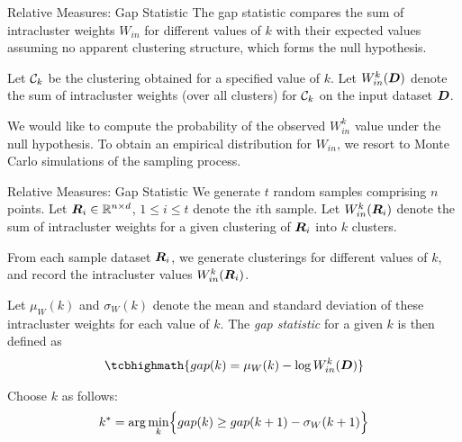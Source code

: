 \begin{frame}{Relative Measures: Gap Statistic}
The gap statistic compares the sum of
intracluster
weights $W_{in}$ 
for different values of $k$ with their expected values assuming
no apparent clustering structure, which forms the null hypothesis.

\bigskip
Let ${\mathcal C}_k$ be the clustering obtained for a specif\/{i}ed value of $k$.
Let $W_{in}^k({\boldsymbol D})$ denote
the sum of intracluster weights (over all clusters) for ${\mathcal C}_k$ on the
input dataset ${\boldsymbol D}$.

\bigskip
We would like to compute the probability of the observed
$W_{in}^k$ value under the null hypothesis.
To obtain an empirical distribution for $W_{in}$, we resort to Monte
Carlo simulations of the sampling process.  
\end{frame}

\begin{frame}{Relative Measures: Gap Statistic}
We generate $t$
random samples comprising $n$ points.
Let ${\boldsymbol R}_i \in {\mathord{\mathbb R}}^{n \times d}$, $1 \le i \le t$ denote the $i$th sample.
Let $W_{in}^k({\boldsymbol R}_i)$ denote the sum of intracluster weights for a
given clustering of ${\boldsymbol R}_i$ into $k$ clusters.

\medskip
From each sample
dataset ${\boldsymbol R}_i$, we generate clusterings for different values of $k$,
and record the intracluster values
$W_{in}^k({\boldsymbol R}_i)$.

\medskip
Let $\mu_W(k)$ and $\sigma_W(k)$ denote the
mean and standard deviation of these intracluster weights for each
value of $k$.
The {\em gap statistic} for a given $k$ is then def\/{i}ned as
\begin{align*}
\tcbhighmath{
  gap(k) = \mu_W(k) - \log  W_{in}^k(\bD)
}
\end{align*}

\medskip
Choose $k$ as follows:
\begin{align*}
  k^* = \arg\min_k \Bigl\{ gap(k) \ge gap(k+1) - \sigma_W(k+1)\Bigr\}
\end{align*}
\end{frame}


